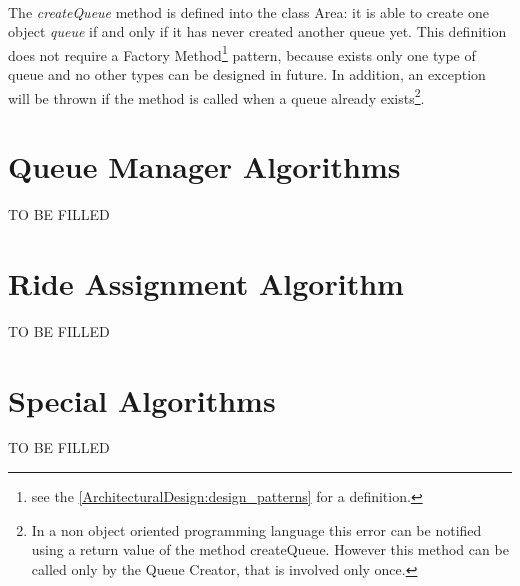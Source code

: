 \documentclass[\mainpath/main]{subfiles}
\begin{document}
\\[0.5cm]

The \textit{createQueue} method is defined into the class Area: it is able to create one object \textit{queue} if and only if it has never created another queue yet. This definition does not require a Factory Method\footnote{see the \autoref{ArchitecturalDesign:design_patterns} for a definition.} pattern, because exists only one type of queue and no other types can be designed in future. In addition, an exception will be thrown if the method is called when a queue already exists\footnote{In a non object oriented programming language this error can be notified using a return value of the method createQueue. However this method can be called only by the Queue Creator, that is involved only once.}.

\section{Queue Manager Algorithms}
\label{AlgorithmDesign:QueueManagerAlgorithms}

TO BE FILLED

\section{Ride Assignment Algorithm}
\label{AlgorithmDesign:RideAssignmentAlgorithm}

TO BE FILLED

\section{Special Algorithms}
\label{AlgorithmDesign:special}

TO BE FILLED
\end{document}
